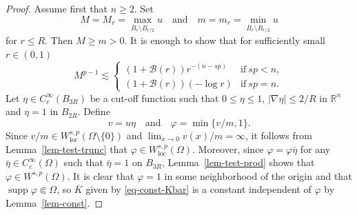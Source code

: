 \documentclass[11pt]{amsart}
\theoremstyle{plain}
\theoremstyle{definition}
\numberwithin{equation}{section}
\DeclareMathOperator{\supp}{supp}
\begin{document}
\begin{proof}
Assume first that $n \geq 2$. Set
\begin{equation}\label{eq-Mm}
M=M_r=\max_{\overline{B}_r \setminus B_{r/2}}u \quad\text{and}\quad m=m_r=\min_{\overline{B}_r \setminus B_{r/2}}u
\end{equation}
for $r \leq R$. Then $M \geq m >0$. It is enough to show that for sufficiently small $r\in(0,1)$
\begin{equation}\label{eq-M}
M^{p-1} \lesssim
\begin{cases}
(1+\mathcal{B}(r)) r^{-(n-sp)} &\text{if}~sp<n, \\
(1+\mathcal{B}(r)) (-\log r) &\text{if}~sp=n.
\end{cases}
\end{equation}
Let $\eta \in C^\infty_c(B_{3R})$ be a cut-off function such that $0 \leq \eta \leq 1$, $|\nabla \eta| \leq 2/R$ in $\mathbb{R}^n$ and $\eta = 1$ in $B_{2R}$. Define
\begin{equation*}
v=u\eta \quad \text{and} \quad \varphi=\min\{ v/m, 1\}.
\end{equation*}
Since $v/m \in W^{s, p}_{\mathrm{loc}}(\Omega \setminus \{0\})$ and $\lim_{x \to 0} v(x)/m=\infty$, it follows from Lemma~\ref{lem-test-trunc} that $\varphi \in W^{s, p}_{\mathrm{loc}}(\Omega)$. Moreover, since $\varphi=\varphi \bar{\eta}$ for any $\bar{\eta} \in C^\infty_c(\Omega)$ such that $\bar{\eta}= 1$ on $B_{3R}$, Lemma~\ref{lem-test-prod} shows that $\varphi \in W^{s, p}(\Omega)$. It is clear that $\varphi= 1$ in some neighborhood of the origin and that $\supp{\varphi} \Subset \Omega$, so $\overline{K}$ given by \eqref{eq-const-Kbar} is a constant independent of $\varphi$ by Lemma~\ref{lem-const}.


\end{proof}
\end{document}
